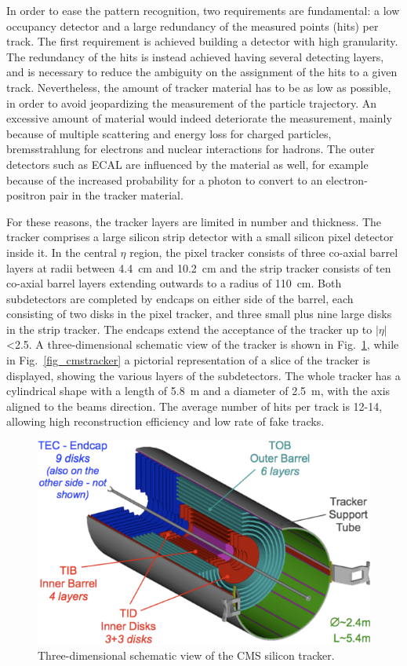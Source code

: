 In order to ease the pattern recognition, two requirements are fundamental:
a low occupancy detector and a large redundancy of the measured points (hits) per track.
The first requirement is achieved building a detector with high granularity. The
redundancy of the hits is instead achieved having several detecting layers, and is
necessary to reduce the ambiguity on the assignment of the hits to a given track.
Nevertheless, the amount of tracker material has to be as low as possible, in order to
avoid jeopardizing the measurement of the particle trajectory. An excessive amount
of material would indeed deteriorate the measurement, mainly because
of multiple scattering and energy loss for charged particles,
bremsstrahlung for electrons and nuclear interactions for hadrons.
The outer detectors such as ECAL are influenced by the material as
well, for example because of the increased probability 
for a photon to convert to an electron-positron pair in the tracker
material.

For these
reasons, the tracker layers are limited in number and thickness. The tracker comprises
a large silicon strip detector with a small silicon pixel detector inside it. In the central
$\eta$ region, the pixel tracker consists of three co-axial barrel layers at radii between
4.4~cm and 10.2~cm and the strip tracker consists of ten co-axial barrel layers extending
outwards to a radius of 110~cm. Both subdetectors are completed by endcaps on either
side of the barrel, each consisting of two disks in the pixel tracker, and three small
plus nine large disks in the strip tracker. The endcaps extend the acceptance of the
tracker up to $|\eta|$<2.5. A three-dimensional schematic view of the tracker is shown in
Fig.~\ref{trk}, while in Fig.~\ref{fig_cmstracker} a pictorial representation of a slice of the tracker is displayed,
showing the various layers of the subdetectors.
The whole tracker has a cylindrical shape with a length of 5.8~m and a diameter
of 2.5~m, with the axis aligned to the beams direction. The average number of hits
per track is 12-14, allowing high reconstruction efficiency and low rate of fake tracks.

\begin{figure}
\centering
\includegraphics[scale= 0.5]{../Cap2/trk}
\caption{Three-dimensional schematic view of the CMS silicon tracker.}
\label{trk}
\end{figure}

